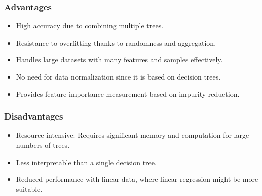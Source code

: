 \smallskip

\subsubsection{Advantages}

\begin{itemize}
    \item High accuracy due to combining multiple trees.
    \item Resistance to overfitting thanks to randomness and aggregation.
    \item Handles large datasets with many features and samples effectively.
    \item No need for data normalization since it is based on decision trees.
    \item Provides feature importance measurement based on impurity reduction.
\end{itemize}

\smallskip

\subsubsection{Disadvantages}

\begin{itemize}
    \item Resource-intensive: Requires significant memory and computation for large numbers of trees.
    \item Less interpretable than a single decision tree.
    \item Reduced performance with linear data, where linear regression might be more suitable.
\end{itemize}